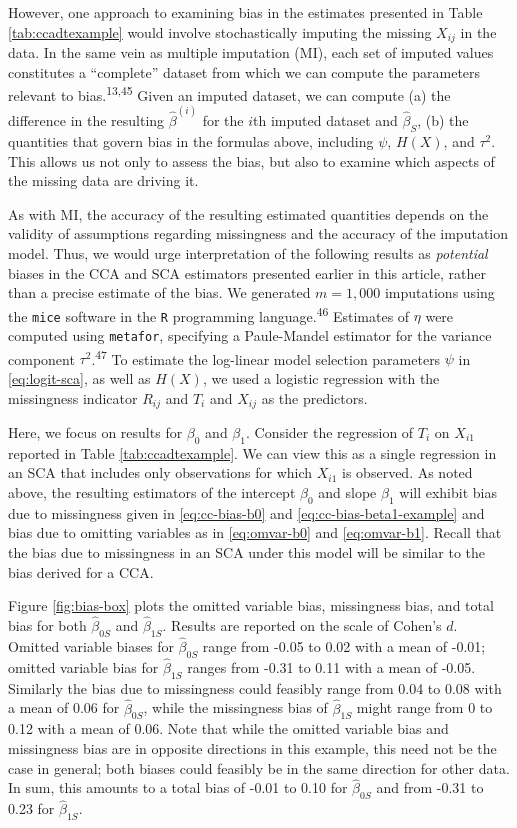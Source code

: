\documentclass[
]{article}
\begin{document}
However, one approach to examining bias in the estimates presented in Table \ref{tab:ccadtexample} would involve stochastically imputing the missing \(X_{ij}\) in the data.
In the same vein as multiple imputation (MI), each set of imputed values constitutes a ``complete'' dataset from which we can compute the parameters relevant to bias.\textsuperscript{13,45}
Given an imputed dataset, we can compute (a) the difference in the resulting \(\hat{\beta}^{(i)}\) for the \(i\)th imputed dataset and \(\hat{\beta}_S\), (b) the quantities that govern bias in the formulas above, including \(\psi\), \(H(X)\), and \(\tau^2\).
This allows us not only to assess the bias, but also to examine which aspects of the missing data are driving it.

As with MI, the accuracy of the resulting estimated quantities depends on the validity of assumptions regarding missingness and the accuracy of the imputation model.
Thus, we would urge interpretation of the following results as \emph{potential} biases in the CCA and SCA estimators presented earlier in this article, rather than a precise estimate of the bias.
We generated \(m = 1,000\) imputations using the \texttt{mice} software in the \texttt{R} programming language.\textsuperscript{46}
Estimates of \(\eta\) were computed using \texttt{metafor}, specifying a Paule-Mandel estimator for the variance component \(\tau^2\).\textsuperscript{47}
To estimate the log-linear model selection parameters \(\psi\) in \eqref{eq:logit-sca}, as well as \(H(X)\), we used a logistic regression with the missingness indicator \(R_{ij}\) and \(T_i\) and \(X_{ij}\) as the predictors.

Here, we focus on results for \(\beta_0\) and \(\beta_1\).
Consider the regression of \(T_i\) on \(X_{i1}\) reported in Table \ref{tab:ccadtexample}.
We can view this as a single regression in an SCA that includes only observations for which \(X_{i1}\) is observed.
As noted above, the resulting estimators of the intercept \(\beta_0\) and slope \(\beta_1\) will exhibit bias due to missingness given in \eqref{eq:cc-bias-b0} and \eqref{eq:cc-bias-beta1-example} and bias due to omitting variables as in \eqref{eq:omvar-b0} and \eqref{eq:omvar-b1}.
Recall that the bias due to missingness in an SCA under this model will be similar to the bias derived for a CCA.

Figure \ref{fig:bias-box} plots the omitted variable bias, missingness bias, and total bias for both \(\hat{\beta}_{0S}\) and \(\hat{\beta}_{1S}\).
Results are reported on the scale of Cohen's \(d\).
Omitted variable biases for \(\hat{\beta}_{0S}\) range from -0.05 to 0.02 with a mean of -0.01; omitted variable bias for \(\hat{\beta}_{1S}\) ranges from -0.31 to 0.11 with a mean of -0.05.
Similarly the bias due to missingness could feasibly range from 0.04 to 0.08 with a mean of 0.06 for \(\hat{\beta}_{0S}\), while the missingness bias of \(\hat{\beta}_{1S}\) might range from 0 to 0.12 with a mean of 0.06.
Note that while the omitted variable bias and missingness bias are in opposite directions in this example, this need not be the case in general; both biases could feasibly be in the same direction for other data.
In sum, this amounts to a total bias of -0.01 to 0.10 for \(\hat{\beta}_{0S}\) and from -0.31 to 0.23 for \(\hat{\beta}_{1S}\).
\end{document}
